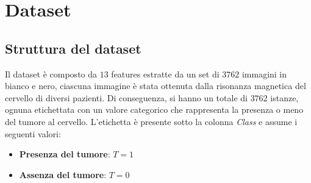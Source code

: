 \chapter{Dataset}
\section{Struttura del dataset}
Il dataset è composto da $13$ features estratte da un set di $3762$ immagini in bianco e nero,
ciascuna immagine è stata ottenuta dalla risonanza magnetica del cervello di diversi pazienti.
Di conseguenza, si hanno un totale di $3762$ istanze, ognuna etichettata con un
valore categorico che rappresenta la presenza o meno del tumore al cervello.
L'etichetta è presente sotto la colonna \textit{Class} e assume i seguenti valori:
\begin{itemize}
      \item \textbf{Presenza del tumore}: $T = 1$
      \item \textbf{Assenza del tumore}: $T = 0$
\end{itemize}

